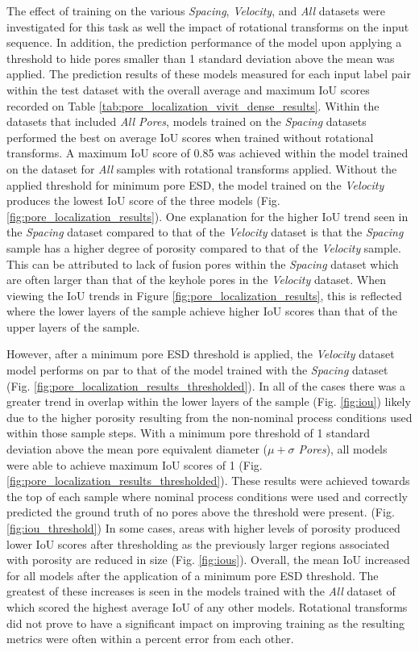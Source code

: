 The effect of training on the various \textit{Spacing}, \textit{Velocity}, and
\textit{All} datasets were investigated for this task as well the impact of 
rotational transforms on the input sequence. In addition, the prediction
performance of the model upon applying a threshold to hide pores smaller than 1
standard deviation above the mean was applied. The prediction results of these
models measured for each input label pair within the test dataset with the
overall average and maximum IoU scores recorded on Table
\ref{tab:pore_localization_vivit_dense_results}. Within the datasets that
included \textit{All Pores}, models trained on the \textit{Spacing} datasets
performed the best on average IoU scores when trained without rotational
transforms. A maximum IoU score of 0.85 was achieved within the model trained on
the dataset for \textit{All} samples with rotational transforms applied. Without
the applied threshold for minimum pore ESD, the model trained on the
\textit{Velocity} produces the lowest IoU score of the three models (Fig.
\ref{fig:pore_localization_results}). One explanation for the higher IoU trend
seen in the \textit{Spacing} dataset compared to that of the \textit{Velocity}
dataset is that the \textit{Spacing} sample has a higher degree of porosity
compared to that of the \textit{Velocity} sample. This can be attributed to lack
of fusion pores within the \textit{Spacing} dataset which are often larger than
that of the keyhole pores in the \textit{Velocity} dataset. When
viewing the IoU trends in Figure \ref{fig:pore_localization_results}, this is
reflected where the lower layers of the sample achieve higher IoU scores than
that of the upper layers of the sample.

However, after a minimum pore ESD threshold is applied, the \textit{Velocity}
dataset model performs on par to that of the model trained with the
\textit{Spacing} dataset (Fig.
\ref{fig:pore_localization_results_thresholded}). In all of the cases there was
a greater trend in overlap within the lower layers of the sample (Fig.
\ref{fig:iou}) likely due to the higher porosity resulting from the non-nominal
process conditions used within those sample steps.  With a minimum pore
threshold of 1 standard deviation above the mean pore equivalent diameter
(\textit{$\mu + \sigma$ Pores}), all models were able to achieve maximum IoU
scores of 1 (Fig. \ref{fig:pore_localization_results_thresholded}). These
results were achieved towards the top of each sample where nominal process
conditions were used and correctly predicted the ground truth of no pores above
the threshold were present. (Fig.  \ref{fig:iou_threshold}) In some cases, areas
with higher levels of porosity produced lower IoU scores after thresholding as
the previously larger regions associated with porosity are reduced in size (Fig.
\ref{fig:ious}). Overall, the mean IoU increased for all models after the
application of a minimum pore ESD threshold.  The greatest of these increases is
seen in the models trained with the \textit{All} dataset of which scored the
highest average IoU of any other models. Rotational transforms did not prove to
have a significant impact on improving training as the resulting metrics were
often within a percent error from each other.

